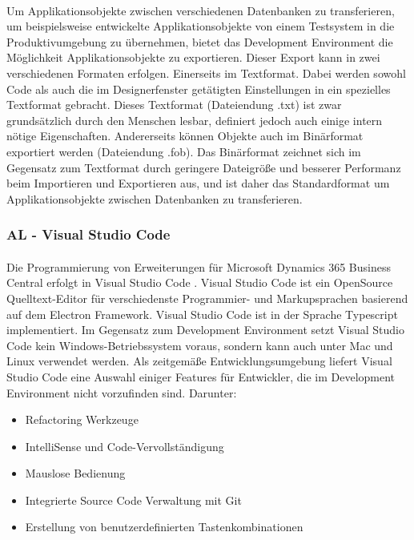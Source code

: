 \paragraph{}
Um Applikationsobjekte zwischen verschiedenen Datenbanken zu transferieren, um beispielsweise entwickelte Applikationsobjekte von einem Testsystem in die Produktivumgebung zu übernehmen, bietet das Development Environment die Möglichkeit Applikationsobjekte zu exportieren. Dieser Export kann in zwei verschiedenen Formaten erfolgen. Einerseits im Textformat. Dabei werden sowohl Code als auch die im Designerfenster getätigten Einstellungen in ein spezielles Textformat gebracht. Dieses Textformat (Dateiendung .txt) ist zwar grundsätzlich durch den Menschen lesbar, definiert jedoch auch einige intern nötige Eigenschaften. Andererseits können Objekte auch im Binärformat exportiert werden (Dateiendung .fob). Das Binärformat zeichnet sich im Gegensatz zum Textformat durch geringere Dateigröße und besserer Performanz beim Importieren und Exportieren aus, und ist daher das Standardformat um Applikationsobjekte zwischen Datenbanken zu transferieren.

\subsubsection{AL - Visual Studio Code}
\paragraph{}
Die Programmierung von Erweiterungen für Microsoft Dynamics 365 Business Central erfolgt in Visual Studio Code \cite{KahlertGiza2016}. Visual Studio Code ist ein OpenSource Quelltext-Editor für verschiedenste Programmier- und Markupsprachen basierend auf dem Electron Framework. Visual Studio Code ist in der Sprache Typescript implementiert. Im Gegensatz zum Development Environment setzt Visual Studio Code kein Windows-Betriebssystem voraus, sondern kann auch unter Mac und Linux verwendet werden. Als zeitgemäße Entwicklungsumgebung liefert Visual Studio Code eine Auswahl einiger Features für Entwickler, die im Development Environment nicht vorzufinden sind. Darunter:

\begin{itemize}
	\item Refactoring Werkzeuge
	\item IntelliSense und Code-Vervollständigung
	\item Mauslose Bedienung
	\item Integrierte Source Code Verwaltung mit Git
	\item Erstellung von benutzerdefinierten Tastenkombinationen
\end{itemize}

